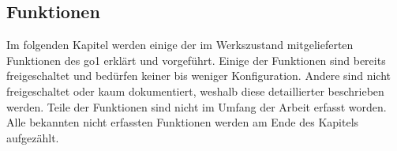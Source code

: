 \subsection{Funktionen}
\label{subsec:funktionen}

Im folgenden Kapitel werden einige der im Werkszustand mitgelieferten Funktionen des \gls{go1} erklärt und vorgeführt.
Einige der Funktionen sind bereits freigeschaltet und bedürfen keiner bis weniger Konfiguration.
Andere sind nicht freigeschaltet oder kaum dokumentiert, weshalb diese detaillierter beschrieben werden.
Teile der Funktionen sind nicht im Umfang der Arbeit erfasst worden.
Alle bekannten nicht erfassten Funktionen werden am Ende des Kapitels aufgezählt.